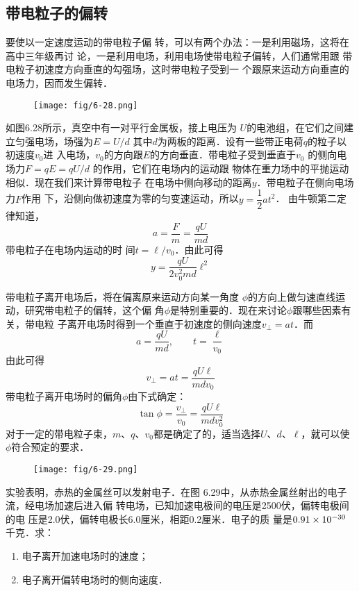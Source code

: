 \subsection{带电粒子的偏转}


要使以一定速度运动的带电粒子偏
转，可以有两个办法：一是利用磁场，这将在高中三年级再讨
论，一是利用电场，利用电场使带电粒子偏转，人们通常用跟
带电粒子初速度方向垂直的勾强场，这时带电粒子受到一
个跟原来运动方向垂直的电场力，因而发生偏转．
\begin{figure}[htp]\centering
	\texttt{[image: fig/6-28.png]}
	\caption{}
	\end{figure}

如图6.28所示，真空中有一对平行金属板，接上电压为
$U$的电池组，在它们之间建立匀强电场，场强为$E=U/d$
其中$d$为两板的距离．设有一些带正电荷$q$的粒子以初速度$v_0$进
入电场，$v_0$的方向跟$E$的方向垂直．带电粒子受到垂直于$v_0$
的侧向电场力$F=qE=qU/d$
的作用，它们在电场内的运动跟
物体在重力场中的平抛运动相似．现在我们来计算带电粒子
在电场中侧向移动的距离$y$．带电粒子在侧向电场力$F$作用
下，沿侧向做初速度为零的匀变速运动，所以$y=\dfrac{1}{2}at^2$．
由牛顿第二定律知道，
\[a=\frac{F}{m}=\frac{qU}{md} \]
带电粒子在电场内运动的时
间$t=\ell/v_0$．由此可得
\[y=\frac{qU}{2v^2_0 md}\ell^2 \]

带电粒子离开电场后，将在偏离原来运动方向某一角度
$\phi$的方向上做匀速直线运动，研究带电粒子的偏转，这个偏
角$\phi$是特别重要的．现在来讨论$\phi$跟哪些因素有关，带电粒
子离开电场时得到一个垂直于初速度的侧向速度$v_{\bot}=at$．而
\[a=\frac{qU}{md},\qquad t=\frac{\ell}{v_0} \]
由此可得
\[v_{\bot}=at=\frac{qU\ell}{mdv_0} \]
带电粒子离开电场时的偏角$\phi$由下式确定：
\[\tan\phi=\frac{v_{\bot}}{v_0}=\frac{qU\ell}{mdv^2_0} \]
对于一定的带电粒子束，$m$、$q$、$v_0$都是确定了的，适当选择$U$、$d$、$\ell$，就可以使
$\phi$符合预定的要求．

\begin{example}
	\begin{figure}[htp]\centering
		\texttt{[image: fig/6-29.png]}
		\caption{}
		\end{figure}

	实验表明，赤热的金属丝可以发射电子．在图
6.29中，从赤热金属丝射出的电子流，经电场加速后进入偏
转电场，已知加速电极间的电压是2500伏，偏转电极间的电
压是2.0伏，偏转电极长6.0厘米，相距0.2厘米．电子的质
量是$0.91\times10^{-30}$千克．求：
\begin{enumerate}
	\item 电子离开加速电场时的速度；
	\item 电子离开偏转电场时的侧向速度．
\end{enumerate}
\end{example}

